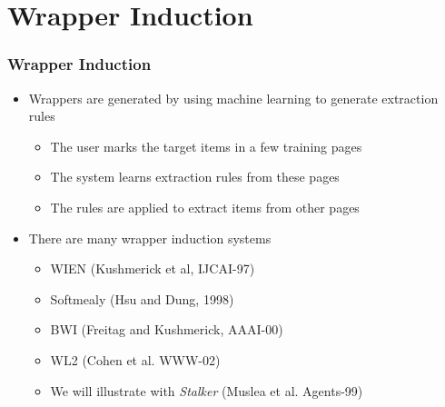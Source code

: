 \documentclass[svgnames]{beamer}
\begin{document}


  




\section{Wrapper Induction}

\begin{frame} \frametitle{Wrapper Induction}
  
  \begin{itemize}
  \item Wrappers are generated by using machine learning to generate extraction
    rules
    \begin{itemize}
    \item The user marks the target items in a few training pages
    \item The system learns extraction rules from these pages
    \item The rules are applied to extract items from other pages
    \end{itemize}
  \item There are many wrapper induction systems
    \begin{itemize}
    \item WIEN (Kushmerick et al, IJCAI-97)
    \item Softmealy (Hsu and Dung, 1998)
    \item BWI (Freitag and Kushmerick, AAAI-00)
    \item WL2 (Cohen et al. WWW-02)
    \item We will illustrate with \emph{Stalker} (Muslea et al. Agents-99)
    \end{itemize}
  \end{itemize}

\end{frame}
\end{document}

